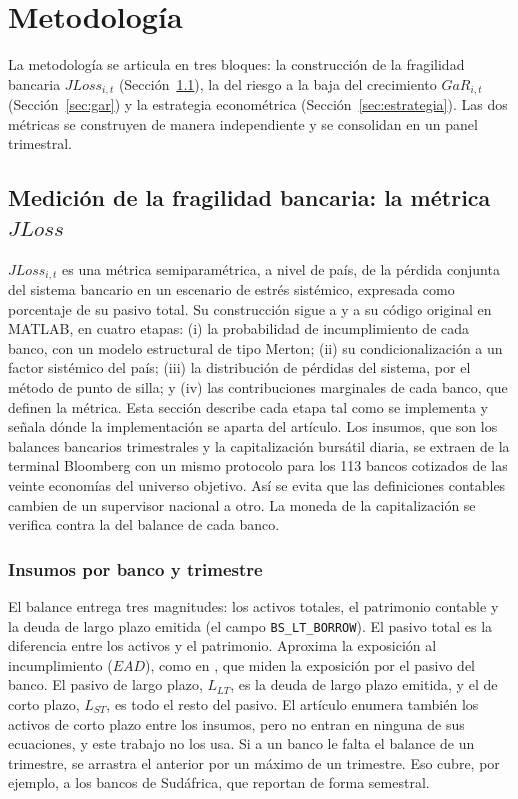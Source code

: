 \section{Metodología}
\label{sec:metodologia}

La metodología se articula en tres bloques: la construcción de la fragilidad bancaria $JLoss_{i,t}$ (Sección~\ref{sec:jloss}), la del riesgo a la baja del crecimiento $GaR_{i,t}$ (Sección~\ref{sec:gar}) y la estrategia econométrica (Sección~\ref{sec:estrategia}). Las dos métricas se construyen de manera independiente y se consolidan en un panel trimestral.

\subsection{Medición de la fragilidad bancaria: la métrica \texorpdfstring{$JLoss$}{JLoss}}
\label{sec:jloss}

$JLoss_{i,t}$ es una métrica semiparamétrica, a nivel de país, de la pérdida conjunta del sistema bancario en un escenario de estrés sistémico, expresada como porcentaje de su pasivo total. Su construcción sigue a \citet{Chari2024b} y a su código original en MATLAB, en cuatro etapas: (i) la probabilidad de incumplimiento de cada banco, con un modelo estructural de tipo Merton; (ii) su condicionalización a un factor sistémico del país; (iii) la distribución de pérdidas del sistema, por el método de punto de silla; y (iv) las contribuciones marginales de cada banco, que definen la métrica. Esta sección describe cada etapa tal como se implementa y señala dónde la implementación se aparta del artículo. Los insumos, que son los balances bancarios trimestrales y la capitalización bursátil diaria, se extraen de la terminal Bloomberg con un mismo protocolo para los 113 bancos cotizados de las veinte economías del universo objetivo. Así se evita que las definiciones contables cambien de un supervisor nacional a otro. La moneda de la capitalización se verifica contra la del balance de cada banco.

\subsubsection{Insumos por banco y trimestre}
\label{sec:jloss-insumos}

El balance entrega tres magnitudes: los activos totales, el patrimonio contable y la deuda de largo plazo emitida (el campo \texttt{BS\_LT\_BORROW}). El pasivo total es la diferencia entre los activos y el patrimonio. Aproxima la exposición al incumplimiento ($EAD$), como en \citet{Chari2024b}, que miden la exposición por el pasivo del banco. El pasivo de largo plazo, $L_{LT}$, es la deuda de largo plazo emitida, y el de corto plazo, $L_{ST}$, es todo el resto del pasivo. El artículo enumera también los activos de corto plazo entre los insumos, pero no entran en ninguna de sus ecuaciones, y este trabajo no los usa. Si a un banco le falta el balance de un trimestre, se arrastra el anterior por un máximo de un trimestre. Eso cubre, por ejemplo, a los bancos de Sudáfrica, que reportan de forma semestral.

